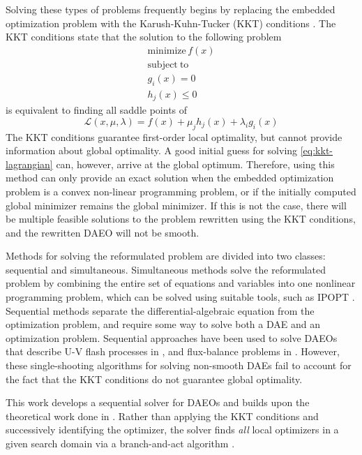 \documentclass[twoside,leqno, twocolumn]{article}
\begin{document}
Solving these types of problems frequently begins by replacing the embedded optimization problem with the Karush-Kuhn-Tucker (KKT) conditions \cite{bieglerNonlinearProgrammingConcepts2010}. The KKT conditions state that the solution to the following problem
\begin{equation*}
	\begin{gathered}
		\mathrm{minimize}\,f(x) \\
		\mathrm{subject\ to} \\
		g_i(x) = 0\\
		h_j(x) \leq 0
	\end{gathered}
\end{equation*}
is equivalent to finding all saddle points of
\begin{equation}
	\label{eq:kkt-lagrangian}
	\mathcal{L}(x, \mu, \lambda) = f(x) + \mu_jh_j(x) + \lambda_ig_i(x)
\end{equation}
The KKT conditions guarantee first-order local optimality, but cannot provide information about global optimality. A good initial guess for solving \eqref{eq:kkt-lagrangian} can, however, arrive at the global optimum. Therefore, using this method can only provide an exact solution when the embedded optimization problem is a convex non-linear programming problem, or if the initially computed global minimizer remains the global minimizer. If this is not the case, there will be multiple feasible solutions to the problem rewritten using the KKT conditions, and the rewritten DAEO will not be smooth\cite{plochDirectSingleShooting2022}. 

Methods for solving the reformulated problem are divided into two classes: sequential and simultaneous. Simultaneous methods solve the reformulated problem by combining the entire set of equations and variables into one nonlinear programming problem, which can be solved using suitable tools, such as IPOPT \cite{bieglerNonlinearProgrammingConcepts2010, wachterImplementationInteriorpointFilter2006}. Sequential methods separate the differential-algebraic equation from the optimization problem, and require some way to solve both a DAE and an optimization problem. Sequential approaches have been used to solve DAEOs that describe U-V flash processes in \cite{ritschelAlgorithmGradientbasedDynamic2018}, and flux-balance problems in \cite{plochDirectSingleShooting2022}. However, these single-shooting algorithms for solving non-smooth DAEs fail to account for the fact that the KKT conditions do not guarantee global optimality.

This work develops a sequential solver for DAEOs and builds upon the theoretical work done in \cite{deussenNumericalSimulationDifferentialalgebraic2023}. Rather than applying the KKT conditions and successively identifying the optimizer, the solver finds \textit{all} local optimizers in a given search domain via a branch-and-act algorithm \cite{bongartzMAiNGOMcCormickbasedAlgorithm, rallGlobalOptimizationUsing1985}. 
\end{document}
